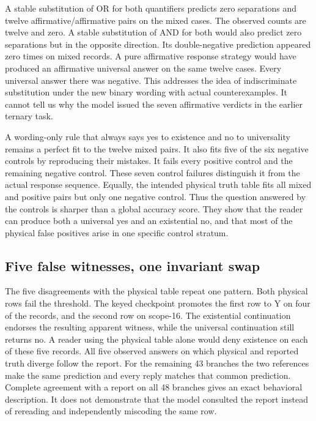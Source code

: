 \documentclass[12pt,letterpaper]{article}
\begin{document}
A stable substitution of OR for both quantifiers predicts zero separations and twelve affirmative/affirmative pairs on the mixed cases. The observed counts are twelve and zero. A stable substitution of AND for both would also predict zero separations but in the opposite direction. Its double-negative prediction appeared zero times on mixed records. A pure affirmative response strategy would have produced an affirmative universal answer on the same twelve cases. Every universal answer there was negative. This addresses the idea of indiscriminate substitution under the new binary wording with actual counterexamples. It cannot tell us why the model issued the seven affirmative verdicts in the earlier ternary task.

A wording-only rule that always says yes to existence and no to universality remains a perfect fit to the twelve mixed pairs. It also fits five of the six negative controls by reproducing their mistakes. It fails every positive control and the remaining negative control. These seven control failures distinguish it from the actual response sequence. Equally, the intended physical truth table fits all mixed and positive pairs but only one negative control. Thus the question answered by the controls is sharper than a global accuracy score. They show that the reader can produce both a universal yes and an existential no, and that most of the physical false positives arise in one specific control stratum.

\subsection{Five false witnesses, one invariant swap}
The five disagreements with the physical table repeat one pattern. Both physical rows fail the threshold. The keyed checkpoint promotes the first row to Y on four of the records, and the second row on scope-16. The existential continuation endorses the resulting apparent witness, while the universal continuation still returns no. A reader using the physical table alone would deny existence on each of these five records. All five observed answers on which physical and reported truth diverge follow the report. For the remaining 43 branches the two references make the same prediction and every reply matches that common prediction. Complete agreement with a report on all 48 branches gives an exact behavioral description. It does not demonstrate that the model consulted the report instead of rereading and independently miscoding the same row.
\end{document}
